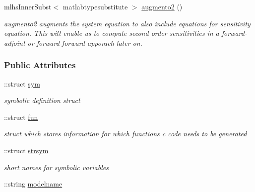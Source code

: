 \begin{DoxyCompactItemize}
mlhs\+Inner\+Subst$<$ matlabtypesubstitute $>$ \hyperlink{classamimodel_a2c41ab7adc2f815030ba175132e648c5}{augmento2} ()
\begin{DoxyCompactList}\small\item\em augmento2 augments the system equation to also include equations for sensitivity equation. This will enable us to compute second order sensitivities in a forward-\/adjoint or forward-\/forward apporach later on. \end{DoxyCompactList}\end{DoxyCompactItemize}
\subsubsection*{Public Attributes}
\begin{DoxyCompactItemize}
\item 
\hypertarget{classamimodel_a3c48fff3d28406486a4f1b5e18da7ca6}{}\+::struct \hyperlink{classamimodel_a3c48fff3d28406486a4f1b5e18da7ca6}{sym}\label{classamimodel_a3c48fff3d28406486a4f1b5e18da7ca6}

\begin{DoxyCompactList}\small\item\em symbolic definition struct \end{DoxyCompactList}\item 
\hypertarget{classamimodel_a743fa290dbc0a67a3843d5ab0426e9b4}{}\+::struct \hyperlink{classamimodel_a743fa290dbc0a67a3843d5ab0426e9b4}{fun}\label{classamimodel_a743fa290dbc0a67a3843d5ab0426e9b4}

\begin{DoxyCompactList}\small\item\em struct which stores information for which functions c code needs to be generated \end{DoxyCompactList}\item 
\hypertarget{classamimodel_a4814315a739f43461b003c1c1ef6f550}{}\+::struct \hyperlink{classamimodel_a4814315a739f43461b003c1c1ef6f550}{strsym}\label{classamimodel_a4814315a739f43461b003c1c1ef6f550}

\begin{DoxyCompactList}\small\item\em short names for symbolic variables \end{DoxyCompactList}\item 
\hypertarget{classamimodel_a71bca9c21a6de42d8079ade31cb61044}{}\+::string \hyperlink{classamimodel_a71bca9c21a6de42d8079ade31cb61044}{modelname}\label{classamimodel_a71bca9c21a6de42d8079ade31cb61044}


\end{DoxyCompactItemize}
